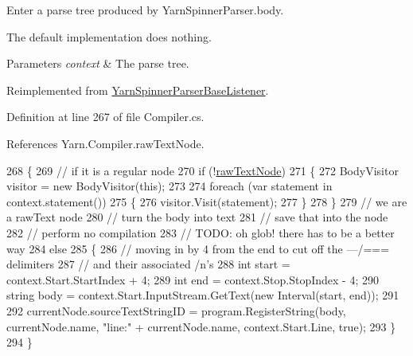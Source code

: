 Enter a parse tree produced by Yarn\-Spinner\-Parser.\-body. 

The default implementation does nothing.


\begin{DoxyParams}{Parameters}
{\em context} & The parse tree.\\
\hline
\end{DoxyParams}


Reimplemented from \hyperlink{a00175_a0bb84237855d76cd67c0214afeaece3c}{Yarn\-Spinner\-Parser\-Base\-Listener}.



Definition at line 267 of file Compiler.\-cs.



References Yarn.\-Compiler.\-raw\-Text\-Node.


\begin{DoxyCode}
268         \{
269             \textcolor{comment}{// if it is a regular node}
270             \textcolor{keywordflow}{if} (!\hyperlink{a00053_af6afc8ccb59931650919b863d62d52a4}{rawTextNode})
271             \{
272                 BodyVisitor visitor = \textcolor{keyword}{new} BodyVisitor(\textcolor{keyword}{this});
273 
274                 \textcolor{keywordflow}{foreach} (var statement \textcolor{keywordflow}{in} context.statement())
275                 \{
276                     visitor.Visit(statement);
277                 \}
278             \}
279             \textcolor{comment}{// we are a rawText node}
280             \textcolor{comment}{// turn the body into text}
281             \textcolor{comment}{// save that into the node}
282             \textcolor{comment}{// perform no compilation}
283             \textcolor{comment}{// TODO: oh glob! there has to be a better way}
284             \textcolor{keywordflow}{else}
285             \{
286                 \textcolor{comment}{// moving in by 4 from the end to cut off the ---/=== delimiters}
287                 \textcolor{comment}{// and their associated /n's}
288                 \textcolor{keywordtype}{int} start = context.Start.StartIndex + 4;
289                 \textcolor{keywordtype}{int} end = context.Stop.StopIndex - 4;
290                 \textcolor{keywordtype}{string} body = context.Start.InputStream.GetText(\textcolor{keyword}{new} Interval(start, end));
291 
292                 currentNode.sourceTextStringID = program.RegisterString(body, currentNode.name, \textcolor{stringliteral}{"line:"} + 
      currentNode.name, context.Start.Line, \textcolor{keyword}{true});
293             \}
294         \}
\end{DoxyCode}
